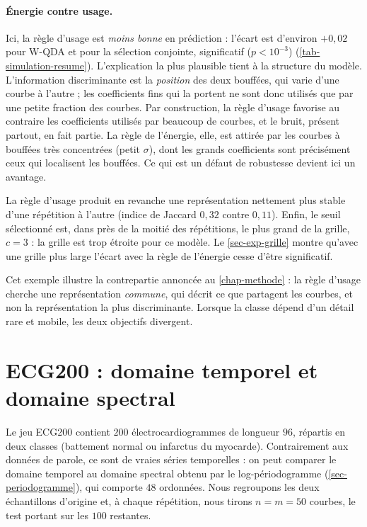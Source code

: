 \paragraph{Énergie contre usage.} Ici, la règle d'usage est \emph{moins bonne} en prédiction : l'écart est d'environ $+0{,}02$ pour W-QDA et pour la sélection conjointe, significatif ($p<10^{-3}$) (\cref{tab-simulation-resume}). L'explication la plus plausible tient à la structure du modèle. L'information discriminante est la \emph{position} des deux bouffées, qui varie d'une courbe à l'autre ; les coefficients fins qui la portent ne sont donc utilisés que par une petite fraction des courbes. Par construction, la règle d'usage favorise au contraire les coefficients utilisés par beaucoup de courbes, et le bruit, présent partout, en fait partie. La règle de l'énergie, elle, est attirée par les courbes à bouffées très concentrées (petit $\sigma$), dont les grands coefficients sont précisément ceux qui localisent les bouffées. Ce qui est un défaut de robustesse devient ici un avantage.

La règle d'usage produit en revanche une représentation nettement plus stable d'une répétition à l'autre (indice de Jaccard $0{,}32$ contre $0{,}11$). Enfin, le seuil sélectionné est, dans près de la moitié des répétitions, le plus grand de la grille, $c=3$ : la grille est trop étroite pour ce modèle. Le \cref{sec-exp-grille} montre qu'avec une grille plus large l'écart avec la règle de l'énergie cesse d'être significatif.

Cet exemple illustre la contrepartie annoncée au \cref{chap-methode} : la règle d'usage cherche une représentation \emph{commune}, qui décrit ce que partagent les courbes, et non la représentation la plus discriminante. Lorsque la classe dépend d'un détail rare et mobile, les deux objectifs divergent.

\section{ECG200 : domaine temporel et domaine spectral}\label{sec-exp-ecg}

Le jeu ECG200 \citep{olszewski2001generalized,dau2019ucr} contient $200$ électrocardiogrammes de longueur $96$, répartis en deux classes (battement normal ou infarctus du myocarde). Contrairement aux données de parole, ce sont de vraies séries temporelles : on peut comparer le domaine temporel au domaine spectral obtenu par le log-périodogramme (\cref{sec-periodogramme}), qui comporte $48$ ordonnées. Nous regroupons les deux échantillons d'origine et, à chaque répétition, nous tirons $n=m=50$ courbes, le test portant sur les $100$ restantes.

